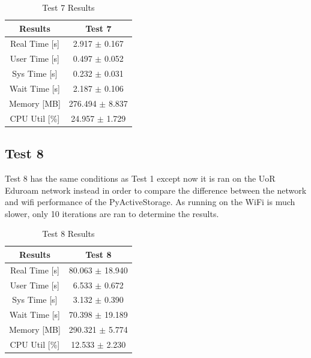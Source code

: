 \documentclass{article}
\begin{document}
\begin{table}[h!]
    \centering
    \begin{tabular}{cc}
        \hline
        \textbf{Results} & Test 7              \\ \hline
        Real Time [s]    & 2.917 $\pm$ 0.167  \\
        User Time [s]    & 0.497 $\pm$ 0.052  \\
        Sys Time [s]     & 0.232 $\pm$ 0.031  \\
        Wait Time [s]    & 2.187 $\pm$ 0.106  \\
        Memory [MB]      & 276.494 $\pm$ 8.837\\
        CPU Util [\%]    & 24.957 $\pm$ 1.729 \\
        \hline
    \end{tabular}
    \caption{Test 7 Results}
    \label{tab:T7_Results}
\end{table}

\break
\subsection{Test 8}
Test 8 has the same conditions as Test 1 except now it is ran on the UoR Eduroam network instead in order to compare the difference between the network and wifi performance of the PyActiveStorage. As running on the WiFi is much slower, only 10 iterations are ran to determine the results.

\begin{table}[h!]
    \centering
    \begin{tabular}{cc}
        \hline
        \textbf{Results} & Test 8              \\ \hline
        Real Time [s]    &80.063 $\pm$ 18.940 \\
        User Time [s]    &6.533 $\pm$ 0.672   \\
        Sys Time [s]     &3.132 $\pm$ 0.390   \\
        Wait Time [s]    &70.398 $\pm$ 19.189 \\
        Memory [MB]      &290.321 $\pm$ 5.774 \\
        CPU Util [\%]    &12.533 $\pm$ 2.230  \\
        \hline
    \end{tabular}
    \caption{Test 8 Results}
    \label{tab:T8_Results}
\end{table}
\end{document}
